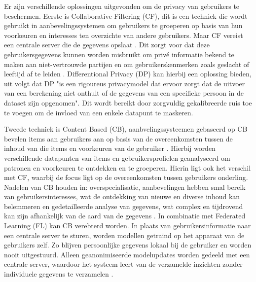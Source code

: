 Er zijn verschillende oplossingen uitgevonden om de privacy van gebruikers te beschermen. Eerste is Collaborative Filtering (CF), dit is een techniek die wordt gebruikt in aanbevelingssystemen om gebruikers te groeperen op basis van hun voorkeuren en interesses ten overzichte van andere gebruikers. Maar CF vereist een centrale server die de gegevens opslaat \autocite{Li2017,Wang2018}. Dit zorgt voor dat deze gebruikersgegevens kunnen worden misbruikt om privé informatie bekend te maken aan niet-vertrouwde partijen en om gebruikerskenmerken zoals geslacht of leeftijd af te leiden \autocite{Lex2023}. 
Differentional Privacy (DP) kan hierbij een oplossing bieden, uit \textcite{Friedman2015,Lex2023} volgt dat DP "is een rigoureus privacymodel dat ervoor zorgt dat de uitvoer van een berekening niet onthult of de gegevens van een specifieke persoon in de dataset zijn opgenomen". Dit wordt bereikt door zorgvuldig gekalibreerde ruis toe te voegen om de invloed van een enkele datapunt te maskeren.

Tweede techniek is Content Based (CB), aanbvelingssysteemen gebaseerd op CB bevelen items aan gebruikers aan op basis van de overeenkomsten tussen de inhoud van die items en voorkeuren van de gebruiker \autocite{Lops2010,Pazzani2007}. Hierbij worden verschillende datapunten van items en gebruikersprofielen geanalyseerd om patronen en voorkeuren te ontdekken en te groeperen. Hierin ligt ook het verschil met CF, waarbij de focus ligt op de overeenkomsten tussen gebruikers onderling. Nadelen van CB houden in: overspecialisatie, aanbevelingen hebben smal bereik van gebruikersinteresses, wat de ontdekking van nieuwe en diverse inhoud kan belemmeren en gedetailleerde analyse van gegevens, wat complex en tijdrovend kan zijn afhankelijk van de aard van de gegevens \autocite{Patel2020,Lops2010}.
In combinatie met Federated Learning (FL) kan CB verebterd worden. In plaats van gebruikersinformatie naar een centrale server te sturen, worden modellen getraind op het apparaat van de gebruikers zelf. Zo blijven persoonlijke gegevens lokaal bij de gebruiker en worden nooit uitgestuurd. Alleen geanonimiseerde modelupdates worden gedeeld met een centrale server, waardoor het systeem leert van de verzamelde inzichten zonder individuele gegevens te verzamelen \autocite{Wang2018, Lops2010}.



